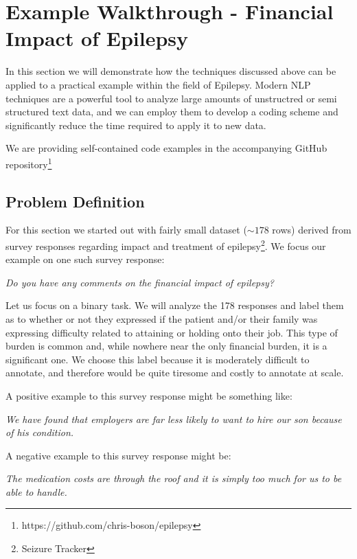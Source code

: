 \section{Example Walkthrough - Financial Impact of Epilepsy}

In this section we will demonstrate how the techniques discussed above can be applied to a practical example within the field of Epilepsy.
Modern NLP techniques are a powerful tool to analyze large amounts of unstructred or semi structured text data, and we can employ them to develop a coding scheme and significantly reduce the time required to apply it to new data.

We are providing self-contained code examples in the accompanying GitHub repository\footnote{https://github.com/chris-boson/epilepsy}


\subsection{Problem Definition}
For this section we started out with fairly small dataset ($\sim178$ rows) derived from survey responses regarding impact and treatment of epilepsy\footnote{Seizure Tracker}.
We focus our example on one such survey response:
\begin{displayquote}
    \textit{Do you have any comments on the financial impact of epilepsy?}
\end{displayquote}

Let us focus on a binary task. We will analyze the 178 responses and label them as to whether or not they expressed if the patient and/or their family was expressing difficulty related to attaining or holding onto their job. This
type of burden is common and, while nowhere near the only financial burden, it is a significant one. We choose this label because it is moderately difficult to annotate, and therefore would be quite tiresome and costly to annotate at scale.

A positive example to this survey response might be something like:
\begin{displayquote}
    \textit{We have found that employers are far less likely to want to hire our son because of his condition.}
\end{displayquote}

A negative example to this survey response might be:
\begin{displayquote}
    \textit{The medication costs are through the roof and it is simply too much for us to be able to handle.}
\end{displayquote}

